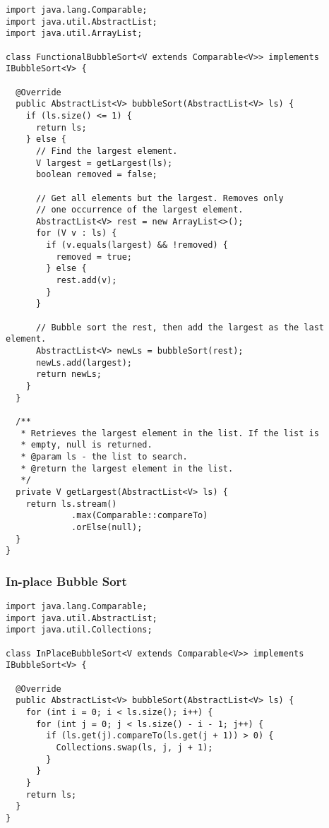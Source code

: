 \begin{lstlisting}[language=MyJava]
import java.lang.Comparable;
import java.util.AbstractList;
import java.util.ArrayList;

class FunctionalBubbleSort<V extends Comparable<V>> implements IBubbleSort<V> {

  @Override
  public AbstractList<V> bubbleSort(AbstractList<V> ls) {
    if (ls.size() <= 1) { 
      return ls; 
    } else {
      // Find the largest element.
      V largest = getLargest(ls);
      boolean removed = false;

      // Get all elements but the largest. Removes only
      // one occurrence of the largest element.
      AbstractList<V> rest = new ArrayList<>();
      for (V v : ls) {
        if (v.equals(largest) && !removed) { 
          removed = true; 
        } else { 
          rest.add(v); 
        }
      }

      // Bubble sort the rest, then add the largest as the last element.
      AbstractList<V> newLs = bubbleSort(rest);
      newLs.add(largest);
      return newLs;
    }
  }

  /**
   * Retrieves the largest element in the list. If the list is 
   * empty, null is returned.
   * @param ls - the list to search.
   * @return the largest element in the list.
   */
  private V getLargest(AbstractList<V> ls) {
    return ls.stream()
             .max(Comparable::compareTo)
             .orElse(null);
  }
}
\end{lstlisting}

\newpage %
\subsubsection*{In-place Bubble Sort}
\begin{lstlisting}[language=MyJava]
import java.lang.Comparable;
import java.util.AbstractList;
import java.util.Collections;

class InPlaceBubbleSort<V extends Comparable<V>> implements IBubbleSort<V> {

  @Override
  public AbstractList<V> bubbleSort(AbstractList<V> ls) {
    for (int i = 0; i < ls.size(); i++) {
      for (int j = 0; j < ls.size() - i - 1; j++) {
        if (ls.get(j).compareTo(ls.get(j + 1)) > 0) {
          Collections.swap(ls, j, j + 1);
        }
      }
    }
    return ls;
  }
}
\end{lstlisting}

